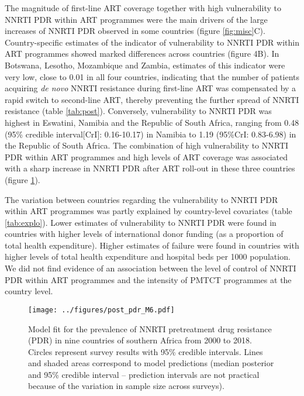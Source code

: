\documentclass{article}
\begin{document}
The magnitude of first-line ART coverage together with high vulnerability to NNRTI PDR within ART programmes were the main drivers of the large increases of NNRTI PDR observed in some countries (figure \ref{fig:misc}C). 
Country-specific estimates of the indicator of vulnerability to NNRTI PDR within ART programmes showed marked differences across countries (figure 4B). 
In Botswana, Lesotho, Mozambique and Zambia, estimates of this indicator were very low, close to 0.01 in all four countries, indicating that the number of patients acquiring {\em de novo} NNRTI resistance during first-line ART was compensated by a rapid switch to second-line ART, thereby preventing the further spread of NNRTI resistance (table \ref{tab:post}).  
Conversely, vulnerability to NNRTI PDR was highest in Eswatini, Namibia and  the Republic of South Africa, ranging from 0.48 (95\% credible interval[CrI]: 0.16-10.17) in Namibia to 1.19 (95\%CrI: 0.83-6.98) in the Republic of South Africa. 
The combination of high vulnerability to NNRTI PDR within ART programmes and high levels of ART coverage was associated with a sharp increase in NNRTI PDR after ART roll-out in these three countries (figure \ref{fig:pdr}).

The variation between countries regarding the vulnerability to NNRTI PDR within ART programmes was partly explained by country-level covariates (table \ref{tab:explo}). Lower estimates of vulnerability to NNRTI PDR were found in countries with higher levels of international donor funding (as a proportion of total health expenditure). Higher estimates of failure were found in countries with higher levels of total health expenditure and hospital beds per 1000 population. We did not find evidence of an association between the level of control of NNRTI PDR within ART programmes and the intensity of PMTCT programmes at the country level.


\begin{figure}[t]
	\texttt{[image: ../figures/post\_pdr\_M6.pdf]}
	\caption{Model fit for the prevalence of NNRTI pretreatment drug resistance (PDR) in nine countries of southern Africa from 2000 to 2018. Circles represent survey results with 95\% credible intervals. Lines and shaded areas correspond to model predictions (median posterior and 95\% credible interval -- prediction intervals are not practical because of the variation in sample size across surveys).}
	\label{fig:pdr}
\end{figure}
\end{document}
